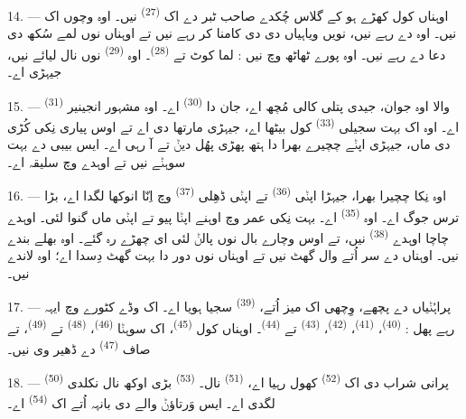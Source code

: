 14. --- اوہناں کول کھڑے ہو کے گلاس چُکدے صاحب ٹبر دے اک 
\textsuperscript{(27)} نیں۔ اوہ  وچوں اک نیں۔ اوہ
 دے رہے نیں، نویں ویاہیاں دی  دی کامنا کر رہے نیں تے
اوہناں نوں لمے سُکھ دی دعا دے رہے نیں۔ اوہ پورے ٹھاٹھ وچ نیں : لما کوٹ تے
 \textsuperscript{(28)}۔ اوہ 
\textsuperscript{(29)} نوں نال لیائے نیں، جیہڑی  اے۔

15. ---  \textsuperscript{(31)} والا اوہ جوان، جیدی پتلی کالی مُچھ
اے، جان دا  \textsuperscript{(30)} اے۔ اوہ مشہور انجینیر اے۔ اوہ
اک بہت سجیلی  \textsuperscript{(33)} کول بیٹھا اے، جیہڑی مارتھا دی
 اے تے اوس پیاری نِکی کُڑی دی ماں، جیہڑی اپݨے چچیرے بھرا دا ہتھ
پھڑی پھُل دیݨ تے   آ رہی اے۔ ایس بیبی دے
 بہت سوہݨے نیں تے اوہدے  وچ سلیقہ اے۔

16. --- اوہ نِکا چچیرا بھرا، جیہڑا اپݨی  \textsuperscript{(36)} تے
اپݨی ڈھِلی  \textsuperscript{(37)} وچ اِنّا انوکھا لگدا اے، بڑا ترس
جوگ اے۔ اوہ  \textsuperscript{(35)} اے۔ بہت نِکی عمر وچ اوہنے اپݨا
پیو تے اپݨی ماں گنوا لئی۔ اوہدے چاچا اوہدے  \textsuperscript{(38)}
نیں، تے اوس وچارے بال نوں پالݨ لئی ای چھڑے رہ گئے۔ اوہ بھلے بندے نیں۔ اوہناں دے
سر اُتے وال گھٹ نیں تے اوہناں نوں دور دا بہت گھٹ دِسدا اے؛ اوہ 
لاندے نیں۔

\VUsaut{2.4mm}
\VUsaut{3.0mm}

17. --- پراہُݨیاں دے پچھے،  وِچھی اک میز اُتے، 
\textsuperscript{(39)} سجیا ہویا اے۔ اک وڈے کٹورے وچ ایہہ رہے پھل :
 \textsuperscript{(40)}،  \textsuperscript{(41)}،
 \textsuperscript{(42)}،  \textsuperscript{(43)} تے
 \textsuperscript{(44)}۔ اوہناں کول 
\textsuperscript{(45)}، اک سوہݨا  \textsuperscript{(46)}،
 \textsuperscript{(48)} تے 
\textsuperscript{(49)}، تے صاف  \textsuperscript{(47)} دے ڈھیر وی
نیں۔

18. ---  \textsuperscript{(50)} پرانی شراب دی اک
 \textsuperscript{(52)} کھول رہیا اے، 
\textsuperscript{(51)} نال۔  \textsuperscript{(53)} بڑی اوکھ نال نکلدی
لگدی اے۔ ایس وَرتاؤݨ والے دی بانہہ اُتے اک  \textsuperscript{(54)}
اے۔

